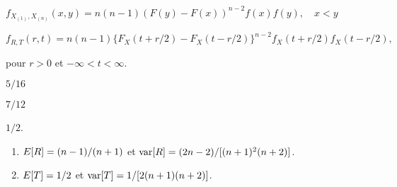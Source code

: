 \begin{reponse}{1.16}
$f_{X_{(1)}, X_{(n)}}(x,y) = n (n - 1) (F(y) - F(x))^{n - 2}  f(x) f(y), \quad x<y$
\end{reponse}
\begin{reponse}{1.17}
$f_{R, T}(r, t) = n (n - 1)\{ F_X(t + r/2) - F_X(t - r/2)\}^{n - 2}
    f_X(t + r/2) f_X(t - r/2),$

pour $r > 0$ et $-\infty < t < \infty$.
\end{reponse}
\begin{reponse}{1.19}
    $5/16$
  
\end{reponse}
\begin{reponse}{1.20}
    $7/12$
  
\end{reponse}
\begin{reponse}{1.21}
    $1/2$.
  
\end{reponse}
\begin{reponse}{1.22}
     \begin{enumerate}
     \item $E [ R ] = (n - 1)/(n + 1)$ et $\mathrm{var} [ R ] = (2n - 2)/[(n +
       1)^2 (n + 2)]$.
     \item $E [ T ] = 1/2$ et $\mathrm{var} [ T ] = 1/[2 (n + 1)(n + 2)]$.
     \end{enumerate}
   
\end{reponse}
